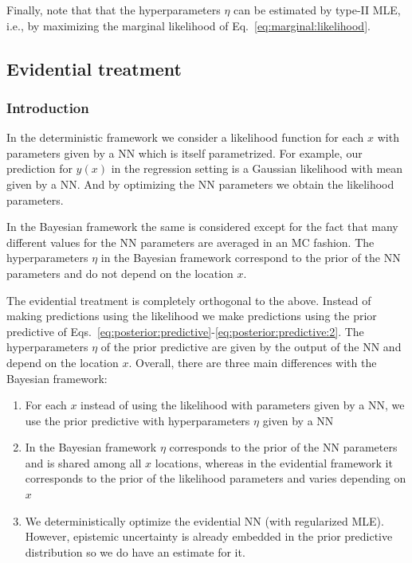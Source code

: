 Finally, note that that the hyperparameters $\eta$ can be estimated by type-II MLE, i.e., by maximizing the marginal likelihood of Eq.~\eqref{eq:marginal:likelihood}.

\subsection{Evidential treatment}
\subsubsection{Introduction}\label{sec:evidential:intro}
In the deterministic framework we consider a likelihood function for each $x$ with parameters given by a NN which is itself parametrized. 
For example, our prediction for $y(x)$ in the regression setting is a Gaussian likelihood with mean given by a NN.
And by optimizing the NN parameters we obtain the likelihood parameters.

In the Bayesian framework the same is considered except for the fact that many different values for the NN parameters are averaged in an MC fashion.
The hyperparameters $\eta$ in the Bayesian framework correspond to the prior of the NN parameters and do not depend on the location $x$. 

The evidential treatment is completely orthogonal to the above.
Instead of making predictions using the likelihood we make predictions using the prior predictive of Eqs.~\eqref{eq:posterior:predictive}-\eqref{eq:posterior:predictive:2}. 
The hyperparameters $\eta$ of the prior predictive are given by the output of the NN and depend on the location $x$. 
Overall, there are three main differences with the Bayesian framework:
\begin{enumerate}
	\item For each $x$ instead of using the likelihood with parameters given by a NN, we use the prior predictive with hyperparameters $\eta$ given by a NN
	\item In the Bayesian framework $\eta$ corresponds to the prior of the NN parameters and is shared among all $x$ locations, whereas in the evidential framework it corresponds to the prior of the likelihood parameters and varies depending on $x$
	\item We deterministically optimize the evidential NN (with regularized MLE).
	However, epistemic uncertainty is already embedded in the prior predictive distribution so we do have an estimate for it.
\end{enumerate}

